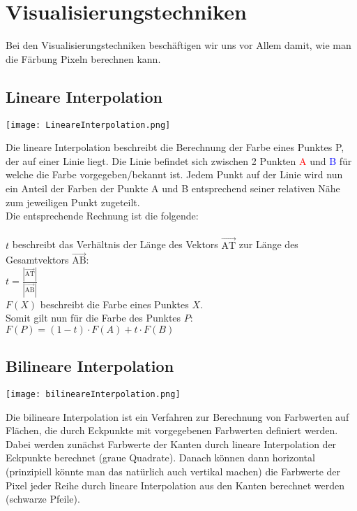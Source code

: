 \section{Visualisierungstechniken}
Bei den Visualisierungstechniken beschäftigen wir uns vor Allem damit, wie man die Färbung Pixeln berechnen kann.

\subsection{Lineare Interpolation}

\texttt{[image: LineareInterpolation.png]}

Die lineare Interpolation beschreibt die Berechnung der Farbe eines Punktes P, der auf einer Linie liegt. Die Linie befindet sich zwischen 2 Punkten \textcolor{red}{A} und \textcolor{blue}{B} für welche die Farbe vorgegeben/bekannt ist. Jedem Punkt auf der Linie wird nun ein Anteil der Farben der Punkte A und B entsprechend seiner relativen Nähe zum jeweiligen Punkt zugeteilt.\\
Die entsprechende Rechnung ist die folgende:\\
\\
$t$ beschreibt das Verhältnis der Länge des Vektors $\overrightarrow{\mathrm{AT}}$ zur Länge des Gesamtvektors $\overrightarrow{\mathrm{AB}}$:\\
$ t = \frac{|\overrightarrow{\mathrm{AT}}|}{|\overrightarrow{\mathrm{AB}}|}$\\
$F(X)$ beschreibt die Farbe eines Punktes $X$.\\
Somit gilt nun für die Farbe des Punktes $P$:\\
\begin{math}
    F(P) = (1 - t) \cdot F(A) + t \cdot F(B)
\end{math}

\subsection{Bilineare Interpolation}

\texttt{[image: bilineareInterpolation.png]}

Die bilineare Interpolation ist ein Verfahren zur Berechnung von Farbwerten auf Flächen, die durch Eckpunkte mit vorgegebenen Farbwerten definiert werden. Dabei werden zunächst Farbwerte der Kanten durch lineare Interpolation der Eckpunkte berechnet (graue Quadrate). Danach können dann horizontal (prinzipiell könnte man das natürlich auch vertikal machen) die Farbwerte der Pixel jeder Reihe durch lineare Interpolation aus den Kanten berechnet werden (schwarze Pfeile).

